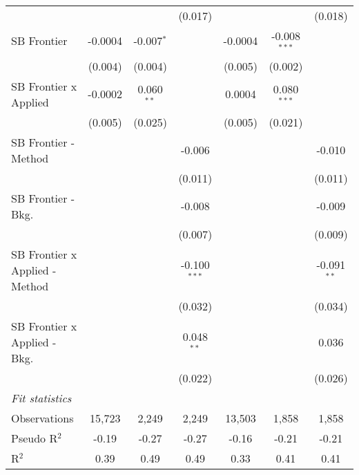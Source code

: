 \begin{tabular}{lcccccc}
                                  &         &              & (0.017)        &              &                & (0.018)\\   
   SB Frontier                    & -0.0004 & -0.007$^{*}$ &                & -0.0004      & -0.008$^{***}$ &   \\   
                                  & (0.004) & (0.004)      &                & (0.005)      & (0.002)        &   \\   
   SB Frontier x Applied          & -0.0002 & 0.060$^{**}$ &                & 0.0004       & 0.080$^{***}$  &   \\   
                                  & (0.005) & (0.025)      &                & (0.005)      & (0.021)        &   \\   
   SB Frontier - Method           &         &              & -0.006         &              &                & -0.010\\   
                                  &         &              & (0.011)        &              &                & (0.011)\\   
   SB Frontier - Bkg.             &         &              & -0.008         &              &                & -0.009\\   
                                  &         &              & (0.007)        &              &                & (0.009)\\   
   SB Frontier x Applied - Method &         &              & -0.100$^{***}$ &              &                & -0.091$^{**}$\\   
                                  &         &              & (0.032)        &              &                & (0.034)\\   
   SB Frontier x Applied - Bkg.   &         &              & 0.048$^{**}$   &              &                & 0.036\\   
                                  &         &              & (0.022)        &              &                & (0.026)\\   
   \midrule
   \emph{Fit statistics}\\
   Observations                   & 15,723  & 2,249        & 2,249          & 13,503       & 1,858          & 1,858\\  
   Pseudo R$^2$                   & -0.19   & -0.27        & -0.27          & -0.16        & -0.21          & -0.21\\  
   R$^2$                          & 0.39    & 0.49         & 0.49           & 0.33         & 0.41           & 0.41\\  
   

\end{tabular}

